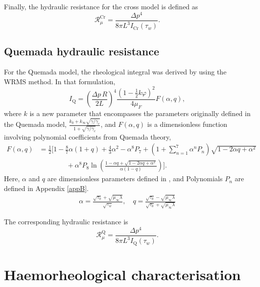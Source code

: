 \documentclass[lineno]{jfm}
\begin{document}
Finally, the hydraulic resistance for the cross model is defined as
\begin{equation}
\mathcal{R}_{\mu}^{\mathrm{Cr}}
=
\frac{\Delta p^4}{8\pi L^3 I_{\mathrm{Cr}}(\tau_w)}.
\label{eq:R_Cr}
\end{equation}

\subsection{Quemada hydraulic resistance}

For the Quemada model, the rheological integral was derived by \citet{Popel1993} using the WRMS method. In that formulation,
\begin{equation}
I_{\mathrm{Q}}
=
\left(\frac{\Delta p\,R}{2L}\right)^4
\frac{\left(1-\frac{1}{2}k\varphi\right)^2}{4\mu_F}
F(\alpha,q),
\label{eq:I_Q}
\end{equation}
where $k$ is a new parameter that encompasses the parameters originally defined in the Quemada model, $\frac{k_0+k_\infty \sqrt{\dot{\gamma}/\dot{\gamma_c}}}{1+\sqrt{\dot{\gamma}/\dot{\gamma_c}}}$, and $F(\alpha,q)$ is a dimensionless function involving polynomial coefficients from Quemada theory,
\begin{align}
F(\alpha,q)
&=
\frac{1}{2}\Bigg[
1-\frac{8}{7}\alpha(1+q)+\frac{4}{3}\alpha^2-\alpha^8P_7
+\left(1+\sum_{n=1}^{7}\alpha^nP_n\right)\sqrt{1-2\alpha q+\alpha^2}\nonumber\\
&\qquad\qquad
+\alpha^8P_8
\ln\left(
\frac{1-\alpha q+\sqrt{1-2\alpha q+\alpha^2}}{\alpha(1-q)}
\right)
\Bigg].
\label{eq:F_alpha_q}
\end{align}
Here, $\alpha$ and $q$ are dimensionless parameters defined in \citet{Popel1993}, and Polynomials $P_n$ are defined in Appendix \ref{appB}.
\begin{align*}
    \alpha = \frac{\sqrt{\tau_0} + \sqrt{\mu_\infty \lambda}}{\sqrt{\tau_w}}, \quad
    q = \frac{\sqrt{\tau_0} - \sqrt{\mu_\infty \lambda}}{\sqrt{\tau_0} + \sqrt{\mu_\infty \lambda}}
\end{align*}

The corresponding hydraulic resistance is
\begin{equation}
\mathcal{R}_{\mu}^{\mathrm{Q}}
=
\frac{\Delta p^4}{8\pi L^3 I_{\mathrm{Q}}(\tau_w)}.
\label{eq:R_Q}
\end{equation}

\section{Haemorheological characterisation}
\label{sec:hemochar}
\end{document}
